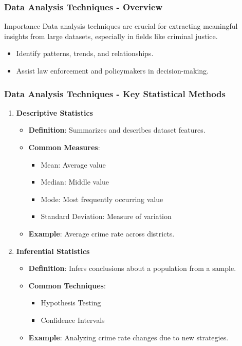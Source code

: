 \documentclass[aspectratio=169]{beamer}
\begin{document}
\begin{frame}[fragile]
    \frametitle{Data Analysis Techniques - Overview}
    \begin{block}{Importance}
        Data analysis techniques are crucial for extracting meaningful insights from large datasets, especially in fields like criminal justice.
    \end{block}
    \begin{itemize}
        \item Identify patterns, trends, and relationships.
        \item Assist law enforcement and policymakers in decision-making.
    \end{itemize}
\end{frame}

\begin{frame}[fragile]
    \frametitle{Data Analysis Techniques - Key Statistical Methods}
    \begin{enumerate}
        \item \textbf{Descriptive Statistics}
            \begin{itemize}
                \item \textbf{Definition}: Summarizes and describes dataset features.
                \item \textbf{Common Measures}:
                    \begin{itemize}
                        \item Mean: Average value
                        \item Median: Middle value
                        \item Mode: Most frequently occurring value
                        \item Standard Deviation: Measure of variation
                    \end{itemize}
                \item \textbf{Example}: Average crime rate across districts.
            \end{itemize}
        \item \textbf{Inferential Statistics}
            \begin{itemize}
                \item \textbf{Definition}: Infers conclusions about a population from a sample.
                \item \textbf{Common Techniques}:
                    \begin{itemize}
                        \item Hypothesis Testing
                        \item Confidence Intervals
                    \end{itemize}
                \item \textbf{Example}: Analyzing crime rate changes due to new strategies.
            \end{itemize}
    \end{enumerate}
\end{frame}
\end{document}
